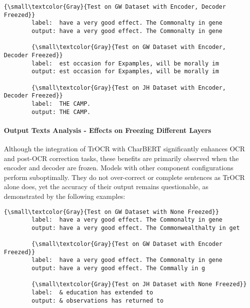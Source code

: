 \begin{center}
    \begin{minipage}{1.0\textwidth}
    \begin{Verbatim}[commandchars=\\\{\}]
        {\small\textcolor{Gray}{Test on GW Dataset with Encoder, Decoder Freezed}}
        label:  have a very good effect. The Commonalty in gene
        output: have a very good effect. The Commonalty in gene

        {\small\textcolor{Gray}{Test on GW Dataset with Encoder, Decoder Freezed}}
        label:  est occasion for Expamples, will be morally im
        output: est occasion for Expamples, will be morally im 

        {\small\textcolor{Gray}{Test on JH Dataset with Encoder, Decoder Freezed}}
        label:  THE CAMP.
        output: THE CAMP.  
    \end{Verbatim}
    \end{minipage}
\end{center}

\paragraph*{Output Texts Analysis - Effects on Freezing Different Layers}
Although the integration of TrOCR with CharBERT significantly enhances OCR and post-OCR correction tasks, these benefits are primarily observed when the encoder and decoder are frozen. Models with other component configurations perform suboptimally. They do not over-correct or complete sentences as TrOCR alone does, yet the accuracy of their output remains questionable, as demonstrated by the following examples:

\begin{center}
    \begin{minipage}{1.0\textwidth}
    \begin{Verbatim}[commandchars=\\\{\}]
        {\small\textcolor{Gray}{Test on GW Dataset with None Freezed}}
        label:  have a very good effect. The Commonalty in gene
        output: have a very good effect. The Commonwealthalty in get

        {\small\textcolor{Gray}{Test on GW Dataset with Encoder Freezed}}
        label:  have a very good effect. The Commonalty in gene
        output: have a very good effect. The Commally in g

        {\small\textcolor{Gray}{Test on JH Dataset with None Freezed}}
        label:  & education has extended to
        output: & observations has returned to
    \end{Verbatim}
    \end{minipage}
\end{center}

